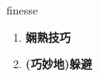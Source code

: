 
\begin{frame}
{\huge finesse}
\begin{center}
\begin{enumerate}\Large
  \item \textbf{娴熟技巧}
  \item \textbf{(巧妙地)躲避}
\end{enumerate}
\end{center}
\end{frame}
